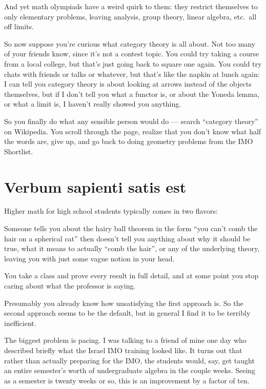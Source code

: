 And yet math olympiads have a weird quirk to them:
they restrict themselves to only elementary problems,
leaving analysis, group theory, linear algebra, etc.\ all off limits.

So now suppose you're curious what category theory is all about.
Not too many of your friends know, since it's not a contest topic.
You could try taking a course from a local college, but that's just going back to square one again.
You could try chats with friends or talks or whatever, but that's like the napkin at lunch again:
I can tell you category theory is about looking at arrows instead of the objects themselves,
but if I don't tell you what a functor is, or about the Yoneda lemma,
or what a limit is, I haven't really showed you anything.

So you finally do what any sensible person would do --- search ``category theory'' on Wikipedia.
You scroll through the page, realize that you don't know what half the words are,
give up, and go back to doing geometry problems from the IMO Shortlist.

\section*{Verbum sapienti satis est}
Higher math for high school students typically comes in two flavors:
\begin{itemize}
	\ii Someone tells you about the hairy ball theorem in the form
	``you can't comb the hair on a spherical cat''
	then doesn't tell you anything about why it should be true,
	what it means to actually ``comb the hair'', 
	or any of the underlying theory,
	leaving you with just some vague notion in your head.

	\ii You take a class and prove every result in full detail,
	and at some point
	you stop caring about what the professor is saying.
\end{itemize}
Presumably you already know how unsatisfying the first approach is.
So the second approach seems to be the default,
but in general I find it to be terribly inefficient.

The biggest problem is pacing.
I was talking to a friend of mine one day who described briefly
what the Israel IMO training looked like.
It turns out that rather than actually preparing for the IMO,
the students would, say, get taught an entire semester's worth of
undergraduate algebra in the couple weeks.
Seeing as a semester is twenty weeks or so, this is an improvement
by a factor of ten.

